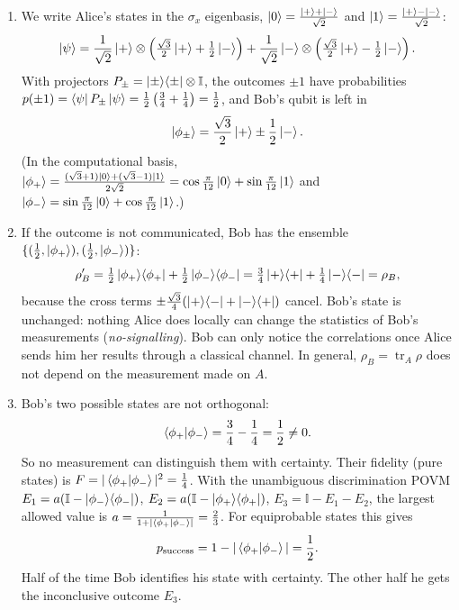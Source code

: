 \documentclass[11pt,a4paper]{article}
\newcommand{\tr}{\operatorname{tr}}
\newcommand{\id}{\mathbb{I}}
\begin{document}
\begin{enumerate}
\item We write Alice's states in the $\sigma_x$ eigenbasis, $\ket0=\frac{\ket++\ket-}{\sqrt2}$ and $\ket1=\frac{\ket+-\ket-}{\sqrt2}$:
\[
\ket\psi=\frac1{\sqrt2}\ket+\otimes\left(\tfrac{\sqrt3}{2}\ket++\tfrac12\ket-\right)+\frac1{\sqrt2}\ket-\otimes\left(\tfrac{\sqrt3}{2}\ket+-\tfrac12\ket-\right).
\]
With projectors $P_\pm=\ket\pm\!\bra\pm\otimes\id$, the outcomes $\pm1$ have probabilities
$p(\pm1)=\bra\psi P_\pm\ket\psi=\frac12\left(\frac34+\frac14\right)=\frac12$, and Bob's qubit is left in
\[
\ket{\phi_\pm}=\frac{\sqrt3}{2}\ket+\pm\frac12\ket- .
\]
(In the computational basis, $\ket{\phi_+}=\frac{(\sqrt3+1)\ket0+(\sqrt3-1)\ket1}{2\sqrt2}=\cos\frac\pi{12}\ket0+\sin\frac\pi{12}\ket1$ and
$\ket{\phi_-}=\sin\frac\pi{12}\ket0+\cos\frac\pi{12}\ket1$.)

\item If the outcome is not communicated, Bob has the ensemble $\{(\frac12,\ket{\phi_+}),(\frac12,\ket{\phi_-})\}$:
\[
\rho_B'=\tfrac12\ket{\phi_+}\!\bra{\phi_+}+\tfrac12\ket{\phi_-}\!\bra{\phi_-}
=\tfrac34\ket+\!\bra++\tfrac14\ket-\!\bra-=\rho_B ,
\]
because the cross terms $\pm\frac{\sqrt3}4(\ket+\!\bra-+\ket-\!\bra+)$ cancel. Bob's state is unchanged:
nothing Alice does locally can change the statistics of Bob's measurements (\emph{no-signalling}).
Bob can only notice the correlations once Alice sends him her results through a classical channel.
In general, $\rho_B=\tr_A\rho$ does not depend on the measurement made on $A$.

\item Bob's two possible states are not orthogonal:
\[
\braket{\phi_+|\phi_-}=\frac34-\frac14=\frac12\neq0 .
\]
So no measurement can distinguish them with certainty. Their fidelity (pure states) is
$F=|\braket{\phi_+|\phi_-}|^2=\frac14$. With the unambiguous discrimination POVM
$E_1=a(\id-\ket{\phi_-}\!\bra{\phi_-})$, $E_2=a(\id-\ket{\phi_+}\!\bra{\phi_+})$, $E_3=\id-E_1-E_2$, the
largest allowed value is $a=\frac1{1+|\braket{\phi_+|\phi_-}|}=\frac23$. For equiprobable states this gives
\[
p_{\rm success}=1-|\braket{\phi_+|\phi_-}|=\frac12 .
\]
Half of the time Bob identifies his state with certainty. The other half he gets the inconclusive outcome $E_3$.
\end{enumerate}
\end{document}
